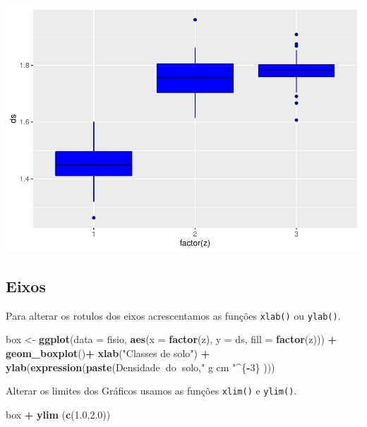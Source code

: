 \documentclass[]{book}
\newenvironment{Shaded}{\begin{snugshade}}{\end{snugshade}}
\newcommand{\DataTypeTok}[1]{\textcolor[rgb]{0.13,0.29,0.53}{#1}}
\newcommand{\DecValTok}[1]{\textcolor[rgb]{0.00,0.00,0.81}{#1}}
\newcommand{\FloatTok}[1]{\textcolor[rgb]{0.00,0.00,0.81}{#1}}
\newcommand{\KeywordTok}[1]{\textcolor[rgb]{0.13,0.29,0.53}{\textbf{#1}}}
\newcommand{\NormalTok}[1]{#1}
\newcommand{\OperatorTok}[1]{\textcolor[rgb]{0.81,0.36,0.00}{\textbf{#1}}}
\newcommand{\StringTok}[1]{\textcolor[rgb]{0.31,0.60,0.02}{#1}}
\begin{document}
\includegraphics{TudodoR_files/figure-latex/unnamed-chunk-202-1.pdf}

\hypertarget{eixos}{%
\subsection{Eixos}\label{eixos}}

Para alterar os rotulos dos eixos acrescentamos as funções \texttt{xlab()} ou \texttt{ylab()}.

\begin{Shaded}
\begin{Highlighting}[]
\NormalTok{box <-}\StringTok{ }\KeywordTok{ggplot}\NormalTok{(}\DataTypeTok{data =}\NormalTok{ fisio, }\KeywordTok{aes}\NormalTok{(}\DataTypeTok{x =} \KeywordTok{factor}\NormalTok{(z), }\DataTypeTok{y =}\NormalTok{ ds, }\DataTypeTok{fill =} \KeywordTok{factor}\NormalTok{(z))) }\OperatorTok{+}
\StringTok{  }\KeywordTok{geom_boxplot}\NormalTok{()}\OperatorTok{+}
\StringTok{  }\KeywordTok{xlab}\NormalTok{(}\StringTok{"Classes de solo"}\NormalTok{) }\OperatorTok{+}
\StringTok{  }\KeywordTok{ylab}\NormalTok{(}\KeywordTok{expression}\NormalTok{(}\KeywordTok{paste}\NormalTok{(Densidade}\OperatorTok{~}\NormalTok{do}\OperatorTok{~}\NormalTok{solo,}\StringTok{" g cm "}\OperatorTok{^}\NormalTok{\{}\OperatorTok{-}\DecValTok{3}\NormalTok{\} )))}
\end{Highlighting}
\end{Shaded}

Alterar os limites dos Gráficos usamos as funções \texttt{xlim()} e \texttt{ylim()}.

\begin{Shaded}
\begin{Highlighting}[]
\NormalTok{  box }\OperatorTok{+}\StringTok{ }\KeywordTok{ylim}\NormalTok{ (}\KeywordTok{c}\NormalTok{(}\FloatTok{1.0}\NormalTok{,}\FloatTok{2.0}\NormalTok{))}
\end{Highlighting}
\end{Shaded}
\end{document}

